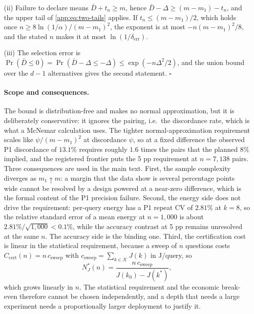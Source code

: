 (ii) Failure to declare means $\bar D+t_{n}\ge m$, hence
$\bar D-\Delta\ge(m-m_{1})-t_{n}$, and the upper tail of
\eqref{app:eq:two-tails} applies. If $t_{n}\le(m-m_{1})/2$, which holds once
$n\ge8\ln(1/\alpha)/(m-m_{1})^{2}$, the exponent is at most
$-n(m-m_{1})^{2}/8$, and the stated $n$ makes it at most
$\ln(1/\delta_{\mathrm{err}})$.

(iii) The selection error is
$\Pr(\bar D\le0)=\Pr(\bar D-\Delta\le-\Delta)\le\exp(-n\Delta^{2}/2)$, and the
union bound over the $d-1$ alternatives gives the second statement.
\hfill$\square$

\paragraph{Scope and consequences.} The bound is distribution-free and makes no
normal approximation, but it is deliberately conservative: it ignores the
pairing, i.e.\ the discordance rate, which is what a McNemar calculation uses.
The tighter normal-approximation requirement scales like
$\psi/(m-m_{1})^{2}$ at discordance $\psi$, so at a fixed difference the observed
P1 discordance of $13.1\%$ requires roughly $1.6$ times the pairs that the
planned $8\%$ implied, and the registered frontier puts the 5 pp requirement at
$n=7{,}138$ pairs. Three consequences are used in the main text. First, the
sample complexity diverges as $m_{1}\uparrow m$: a margin that the data show is
several percentage points wide cannot be resolved by a design powered at a
near-zero difference, which is the formal content of the P1 precision failure.
Second, the energy side does not drive the requirement: per-query energy has a P1
repeat CV of $2.81\%$ at $k=8$, so the relative standard error of a mean energy
at $n=1{,}000$ is about $2.81\%/\sqrt{1{,}000}<0.1\%$, while the accuracy
contrast at 5 pp remains unresolved at the same $n$. The accuracy side is the
binding one. Third, the certification cost is linear in the statistical
requirement, because a sweep of $n$ questions costs
$C_{\mathrm{cert}}(n)=n\,c_{\mathrm{sweep}}$ with
$c_{\mathrm{sweep}}=\sum_{k\in\mathcal{K}}J(k)$ in J/query, so
\begin{equation}\label{app:eq:nstar-n}
  N^{*}_{J}(n)=\frac{n\,c_{\mathrm{sweep}}}{J(k_{0})-J(k^{*})},
\end{equation}
which grows linearly in $n$. The statistical requirement and the economic
break-even therefore cannot be chosen independently, and a depth that needs a
large experiment needs a proportionally larger deployment to justify it.

